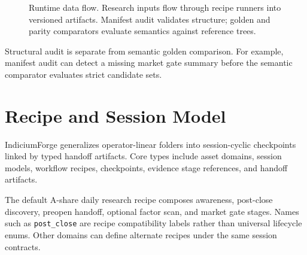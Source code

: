 \documentclass[11pt]{article}
\begin{document}
\begin{figure}[t]
\centering
{}
\caption{Runtime data flow. Research inputs flow through recipe runners into versioned
artifacts. Manifest audit validates structure; golden and parity comparators evaluate
semantics against reference trees.}
\label{fig:runtime}
\end{figure}

Structural audit is separate from semantic golden comparison. For example, manifest audit can
detect a missing market gate summary before the semantic comparator evaluates strict candidate
sets.

\section{Recipe and Session Model}

IndiciumForge generalizes operator-linear folders into session-cyclic checkpoints linked by
typed handoff artifacts. Core types include asset domains, session models, workflow recipes,
checkpoints, evidence stage references, and handoff artifacts.

The default A-share daily research recipe composes awareness, post-close discovery, preopen
handoff, optional factor scan, and market gate stages. Names such as \texttt{post\_close} are
recipe compatibility labels rather than universal lifecycle enums. Other domains can define
alternate recipes under the same session contracts.
\end{document}

